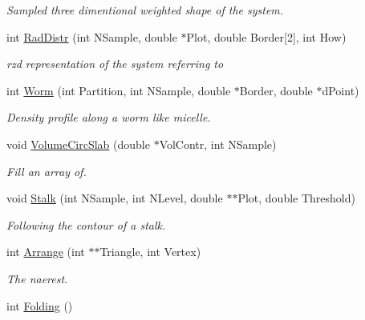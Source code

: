 \begin{DoxyCompactItemize}
\begin{DoxyCompactList}\small\item\em Sampled three dimentional weighted shape of the system. \end{DoxyCompactList}\item 
int \hyperlink{classVarData_a4d034e14a193c9943528897b0356ef42}{Rad\+Distr} (int N\+Sample, double $\ast$Plot, double Border\mbox{[}2\mbox{]}, int How)
\begin{DoxyCompactList}\small\item\em rzd representation of the system referring to \end{DoxyCompactList}\item 
int \hyperlink{classVarData_a2b2420aa629ade75008ceb52b10cf045}{Worm} (int Partition, int N\+Sample, double $\ast$Border, double $\ast$d\+Point)\hypertarget{classVarData_a2b2420aa629ade75008ceb52b10cf045}{}\label{classVarData_a2b2420aa629ade75008ceb52b10cf045}

\begin{DoxyCompactList}\small\item\em Density profile along a worm like micelle. \end{DoxyCompactList}\item 
void \hyperlink{classVarData_acb9df687ca0683b99bdb00425e9da912}{Volume\+Circ\+Slab} (double $\ast$Vol\+Contr, int N\+Sample)
\begin{DoxyCompactList}\small\item\em Fill an array of. \end{DoxyCompactList}\item 
void \hyperlink{classVarData_a7521c027e75a7b726b1afb9f800301f6}{Stalk} (int N\+Sample, int N\+Level, double $\ast$$\ast$Plot, double Threshold)\hypertarget{classVarData_a7521c027e75a7b726b1afb9f800301f6}{}\label{classVarData_a7521c027e75a7b726b1afb9f800301f6}

\begin{DoxyCompactList}\small\item\em Following the contour of a stalk. \end{DoxyCompactList}\item 
int \hyperlink{classVarData_a8d17011a714641fee1a20cceace47f4e}{Arrange} (int $\ast$$\ast$Triangle, int Vertex)
\begin{DoxyCompactList}\small\item\em The naerest. \end{DoxyCompactList}\item 
int \hyperlink{classVarData_af9a9613864841dab614784ea1f9e5f16}{Folding} ()\hypertarget{classVarData_af9a9613864841dab614784ea1f9e5f16}{}\label{classVarData_af9a9613864841dab614784ea1f9e5f16}


\end{DoxyCompactItemize}
